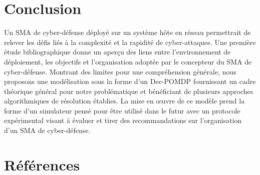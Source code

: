 \documentclass[french]{pfia}
\begin{document}
\section{Conclusion}
Un SMA de cyber-défense déployé sur un système hôte en réseau permettrait de relever les défis liés à la complexité et la rapidité de cyber-attaques. Une première étude bibliographique donne un aperçu des liens entre l'environnement de déploiement, les objectifs et l'organisation adoptée par le concepteur du SMA de cyber-défense.
Montrant des limites pour une compréhension générale, nous proposons une modélisation sous la forme d'un Dec-POMDP fournissant un cadre théorique général pour notre problématique et bénéficiant de plusieurs approches algorithmiques de résolution établies. La mise en œuvre de ce modèle prend la forme d'un simulateur pensé pour être utilisé dans le futur avec un protocole expérimental visant à évaluer et tirer des recommandations sur l'organisation d'un SMA de cyber-défense.


\section*{Références}

% 
%


\end{document}
